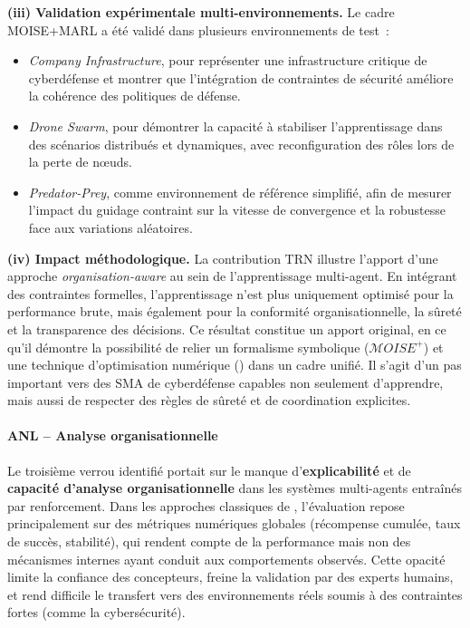 \medskip
\noindent
\textbf{(iii) Validation expérimentale multi-environnements.}
Le cadre MOISE+MARL a été validé dans plusieurs environnements de test~:
\begin{itemize}
  \item \textit{Company Infrastructure}, pour représenter une infrastructure critique de cyberdéfense et montrer que l’intégration de contraintes de sécurité améliore la cohérence des politiques de défense.
  \item \textit{Drone Swarm}, pour démontrer la capacité à stabiliser l’apprentissage dans des scénarios distribués et dynamiques, avec reconfiguration des rôles lors de la perte de nœuds.
  \item \textit{Predator-Prey}, comme environnement de référence simplifié, afin de mesurer l’impact du guidage contraint sur la vitesse de convergence et la robustesse face aux variations aléatoires.
\end{itemize}

\medskip
\noindent
\textbf{(iv) Impact méthodologique.}
La contribution TRN illustre l’apport d’une approche \textit{organisation-aware} au sein de l’apprentissage multi-agent.
En intégrant des contraintes formelles, l’apprentissage n’est plus uniquement optimisé pour la performance brute, mais également pour la conformité organisationnelle, la sûreté et la transparence des décisions.
Ce résultat constitue un apport original, en ce qu’il démontre la possibilité de relier un formalisme symbolique ($\mathcal{M}OISE^+$) et une technique d’optimisation numérique () dans un cadre unifié.
Il s’agit d’un pas important vers des SMA de cyberdéfense capables non seulement d’apprendre, mais aussi de respecter des règles de sûreté et de coordination explicites.

\paragraph{ANL – Analyse organisationnelle}

Le troisième verrou identifié portait sur le manque d’\textbf{explicabilité} et de \textbf{capacité d’analyse organisationnelle} dans les systèmes multi-agents entraînés par renforcement.
Dans les approches classiques de , l’évaluation repose principalement sur des métriques numériques globales (récompense cumulée, taux de succès, stabilité), qui rendent compte de la performance mais non des mécanismes internes ayant conduit aux comportements observés.
Cette opacité limite la confiance des concepteurs, freine la validation par des experts humains, et rend difficile le transfert vers des environnements réels soumis à des contraintes fortes (comme la cybersécurité).

